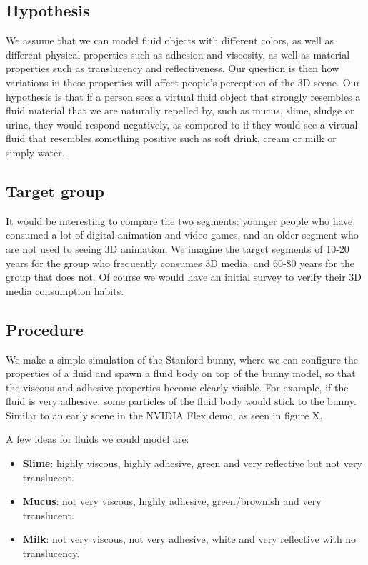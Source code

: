 \documentclass{article}
\begin{document}
\begin{multicols}{2}
        \subsection{Hypothesis}

            We assume that we can model fluid objects with different colors, as well as different physical properties such as adhesion and viscosity, as well as material properties such as translucency and reflectiveness.
            Our question is then how variations in these properties will affect people's perception of the 3D scene.
            Our hypothesis is that if a person sees a virtual fluid object that strongly resembles a fluid material that we are naturally repelled by, such as mucus, slime, sludge or urine, they would respond negatively, as compared to if they would see a virtual fluid that resembles something positive such as soft drink, cream or milk or simply water.

        \subsection{Target group}
        
            It would be interesting to compare the two segments: younger people who have consumed a lot of digital animation and video games, and an older segment who are not used to seeing 3D animation. We imagine the target segments of 10-20 years for the group who frequently consumes 3D media, and 60-80 years for the group that does not. Of course we would have an initial survey to verify their 3D media consumption habits.
            
        \subsection{Procedure}

            We make a simple simulation of the Stanford bunny, where we can configure the properties of a fluid and spawn a fluid body on top of the bunny model, so that the viscous and adhesive properties become clearly visible. For example, if the fluid is very adhesive, some particles of the fluid body would stick to the bunny. Similar to an early scene in the NVIDIA Flex demo, as seen in figure X.

            A few ideas for fluids we could model are:

            \begin{itemize}
                \item \textbf{Slime}: highly viscous, highly adhesive, green and very reflective but not very translucent.
                \item \textbf{Mucus}: not very viscous, highly adhesive, green/brownish and very translucent.
                \item \textbf{Milk}: not very viscous, not very adhesive, white and very reflective with no translucency.
            \end{itemize}


\end{multicols}
\end{document}
